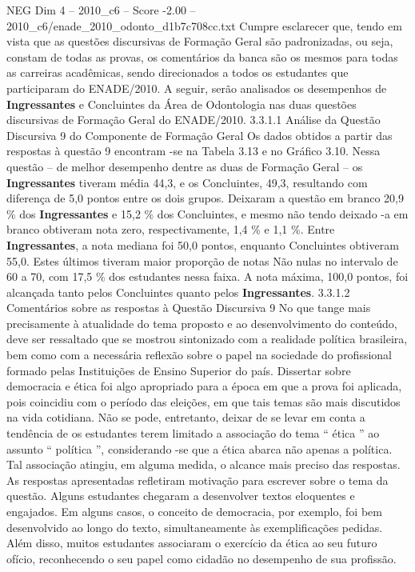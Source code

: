 \begin{textsample}{NEG Dim 4 – 2010\_c6 – Score -2.00 – 2010\_c6/enade\_2010\_odonto\_d1b7c708cc.txt}
Cumpre esclarecer que, tendo em vista que as questões discursivas de Formação Geral são padronizadas, ou seja, constam de todas as provas, os comentários da banca são os mesmos para todas as carreiras acadêmicas, sendo direcionados a todos os estudantes que participaram do ENADE/2010.
A seguir, serão analisados os desempenhos de \textbf{Ingressantes} e Concluintes da Área de Odontologia nas duas questões discursivas de Formação Geral do ENADE/2010. 3.3.1.1 Análise da Questão Discursiva 9 do Componente de Formação Geral Os dados obtidos a partir das respostas à questão 9 encontram -se na Tabela 3.13 e no Gráfico 3.10.
Nessa questão – de melhor desempenho dentre as duas de Formação Geral – os \textbf{Ingressantes} tiveram média 44,3, e os Concluintes, 49,3, resultando com diferença de 5,0 pontos entre os dois grupos.
Deixaram a questão em branco 20,9 \% dos \textbf{Ingressantes} e 15,2 \% dos Concluintes, e mesmo não tendo deixado -a em branco obtiveram nota zero, respectivamente, 1,4 \% e 1,1 \%.
Entre \textbf{Ingressantes}, a nota mediana foi 50,0 pontos, enquanto Concluintes obtiveram 55,0.
Estes últimos tiveram maior proporção de notas Não nulas no intervalo de 60 a 70, com 17,5 \% dos estudantes nessa faixa.
A nota máxima, 100,0 pontos, foi alcançada tanto pelos Concluintes quanto pelos \textbf{Ingressantes}. 3.3.1.2 Comentários sobre as respostas à Questão Discursiva 9 No que tange mais precisamente à atualidade do tema proposto e ao desenvolvimento do conteúdo, deve ser ressaltado que se mostrou sintonizado com a realidade política brasileira, bem como com a necessária reflexão sobre o papel na sociedade do profissional formado pelas Instituições de Ensino Superior do país.
Dissertar sobre democracia e ética foi algo apropriado para a época em que a prova foi aplicada, pois coincidiu com o período das eleições, em que tais temas são mais discutidos na vida cotidiana.
Não se pode, entretanto, deixar de se levar em conta a tendência de os estudantes terem limitado a associação do tema “ ética ” ao assunto “ política ”, considerando -se que a ética abarca não apenas a política.
Tal associação atingiu, em alguma medida, o alcance mais preciso das respostas.
As respostas apresentadas refletiram motivação para escrever sobre o tema da questão.
Alguns estudantes chegaram a desenvolver textos eloquentes e engajados.
Em alguns casos, o conceito de democracia, por exemplo, foi bem desenvolvido ao longo do texto, simultaneamente às exemplificações pedidas.
Além disso, muitos estudantes associaram o exercício da ética ao seu futuro ofício, reconhecendo o seu papel como cidadão no desempenho de sua profissão.

\end{textsample}
